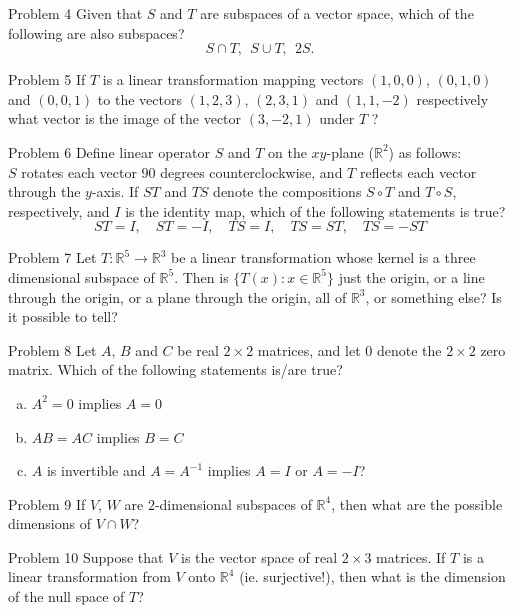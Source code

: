 \documentclass{beamer}
\begin{document}
\begin{frame}{Problem 4}
 Given that $S$ and $T$ are subspaces of a vector space, which of the following
are also subspaces?
$$S\cap T,\ \ S\cup T,\ \ 2S.$$
\end{frame}

\begin{frame}{Problem 5}
If $T$ is a linear transformation mapping vectors $(1, 0, 0)$, $(0, 1, 0)$ and $(0, 0, 1)$ to the vectors $(1, 2, 3)$, $(2, 3, 1)$ and $(1, 1, -2)$ respectively what vector is the image of the vector $(3, -2, 1)$ under $T$ ?
\end{frame}

\begin{frame}{Problem 6}
Define linear operator $S$ and $T$ on the $xy$-plane ($\mathbb R^2$) as follows:\\
$S$ rotates each vector $90$ degrees counterclockwise, and $T$ reflects each vector through the $y$-axis. If
$ST$ and $TS$ denote the compositions $S\circ T$ and $T\circ S$, respectively, and $I$ is the identity map, which of the following statements is true?
$$ST=I,\quad ST=-I,\quad TS=I,\quad TS=ST,\quad TS=-ST$$
\end{frame}

\begin{frame}{Problem 7}
Let $T:\mathbb R^5\rightarrow\mathbb R^3$ be a linear transformation whose kernel is a three dimensional subspace of $\mathbb R^5$. Then is $\{T(x): x\in\mathbb R^5\}$ just the origin, or a line through the origin, or a plane through the origin, all of $\mathbb R^3$, or something else?  Is it possible to tell?
\end{frame}

\begin{frame}{Problem 8}
Let $A$, $B$ and $C$ be real $2\times 2$ matrices, and let $0$ denote the $2\times 2$ zero
matrix. Which of the following statements is/are true?
\begin{enumerate}[(a)]
\item $A^2=0$ implies $A=0$
\item $AB=AC$ implies $B=C$
\item $A$ is invertible and $A=A^{-1}$ implies $A=I$ or $A=-I$?
\end{enumerate}
\end{frame}

\begin{frame}{Problem 9}
If $V$, $W$ are $2$-dimensional subspaces of $\mathbb R^4$, then what are the possible dimensions of $V\cap W$?
\end{frame}

\begin{frame}{Problem 10}
Suppose that $V$ is the vector space of real $2\times 3$ matrices. If $T$ is a linear transformation from $V$ onto $\mathbb R^4$ (ie. surjective!), then what is the dimension of the null space of $T$?
\end{frame}
\end{document}
